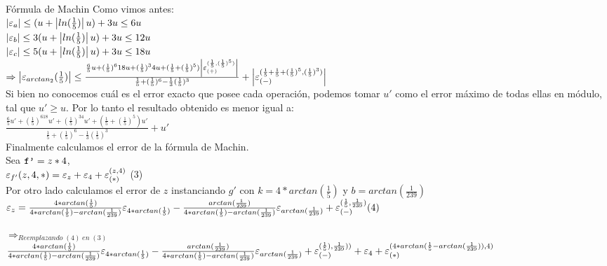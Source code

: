 \begin{subsection}{Fórmula de Machin}
	Como vimos antes:\\
	
	$\left|\varepsilon _{a}\right| \leq (u + \left|ln(\frac{1}{5})\right|u) + 3u \leq 6u$\\
	
	$\left|\varepsilon _{b}\right| \leq 3(u + \left|ln(\frac{1}{5})\right|u) + 3u \leq 12u$\\
	
	$\left|\varepsilon _{c}\right| \leq 5(u + \left|ln(\frac{1}{5})\right|u) + 3u \leq 18u$\\
	
	$\Rightarrow \left| \varepsilon _{arctan_2}({\frac{1}{5}}) \right| \leq \frac{\frac{6}{5}u + (\frac{1}{5})^618u + (\frac{1}{5})^34u + (\frac{1}{5} + (\frac{1}{5})^5)\left| \varepsilon _{({+})}^{({\frac{1}{5},(\frac{1}{5})^5})} \right|}{\frac{1}{5} + (\frac{1}{5})^6 - \frac{1}{3}(\frac{1}{5})^3} + \left|\varepsilon _{({-})}^{({\frac{1}{5} + \frac{1}{5} + (\frac{1}{5})^5,(\frac{1}{5})^3})} \right|$\\
		
	Si bien no conocemos cuál es el error exacto que posee cada operación, podemos tomar $u'$ como el error máximo de todas ellas en módulo, tal que $u' \geq u$. Por lo tanto el resultado obtenido es menor igual a:\\
	
	$\frac{\frac{6}{5}u' + (\frac{1}{5})^618u' + (\frac{1}{5})^34u' + (\frac{1}{5} + (\frac{1}{5})^5)u'}{\frac{1}{5} + (\frac{1}{5})^6 - \frac{1}{3}(\frac{1}{5})^3} + u'$\\
	
	Finalmente calculamos el error de la fórmula de Machin.\\
	
	Sea $\texttt{f'}=z*4$,\\
	
	$\varepsilon _{f'}({z,4,*}) = \varepsilon _{z} + \varepsilon _{4} + \varepsilon _{({*})}^{({z,4})}$ (3)\\
	
	Por otro lado calculamos el error de $z$ instanciando $g'$ con $k=4*arctan(\frac{1}{5})$ y $b=arctan(\frac{1}{239})$\\
	
	$\varepsilon _{z} = \frac{4*arctan(\frac{1}{5})}{4*arctan(\frac{1}{5})-arctan(\frac{1}{239})}\varepsilon _{4*arctan(\frac{1}{5})} - \frac{arctan(\frac{1}{239})}{4*arctan(\frac{1}{5})-arctan(\frac{1}{239})}\varepsilon _{arctan(\frac{1}{239})} + \varepsilon _{({-})}^{({\frac{1}{5},\frac{1}{239}})} (4)$
	
	$\Rightarrow_{Reemplazando \; (4) \; en \; (3)}$\\
	
	$\frac{4*arctan(\frac{1}{5})}{4*arctan(\frac{1}{5})-arctan(\frac{1}{239})}\varepsilon _{4*arctan(\frac{1}{5})} - \frac{arctan(\frac{1}{239})}{4*arctan(\frac{1}{5})-arctan(\frac{1}{239})}\varepsilon _{arctan(\frac{1}{239})} + \varepsilon _{({-})}^{({\frac{1}{5}),\frac{1}{239})})} + \varepsilon _{4} + \varepsilon _{({*})}^{({4*arctan(\frac{1}{5}-arctan(\frac{1}{239})),4})}$\\
	

\end{subsection}
